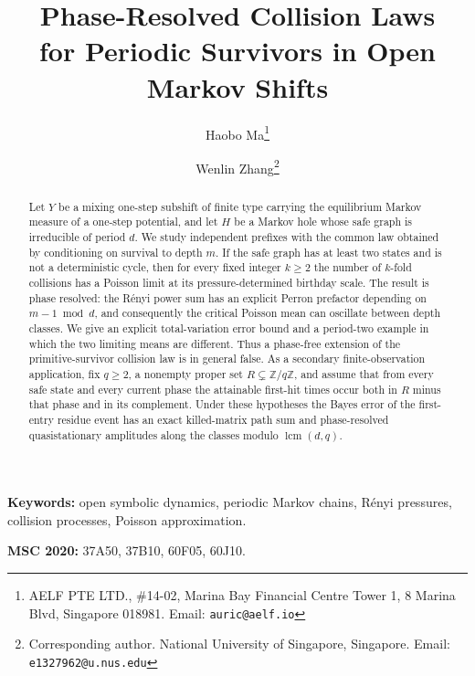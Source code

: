 \documentclass[10pt,a4paper]{article}
\title{Phase-Resolved Collision Laws\\
for Periodic Survivors in Open Markov Shifts}
\author{
  Haobo Ma\thanks{AELF PTE LTD., \#14-02, Marina Bay Financial Centre Tower 1, 8 Marina Blvd, Singapore 018981. Email: \texttt{auric@aelf.io}}
  \and
  Wenlin Zhang\thanks{Corresponding author. National University of Singapore, Singapore. Email: \texttt{e1327962@u.nus.edu}}
}
\date{}
\theoremstyle{plain}
\theoremstyle{definition}
\theoremstyle{remark}
\begin{document}
\maketitle

\begin{abstract}
Let \(Y\) be a mixing one-step subshift of finite type carrying the
equilibrium Markov measure of a one-step potential, and let \(H\) be a
Markov hole whose safe graph is irreducible of period \(d\).  We study
independent prefixes with the common law obtained by conditioning on
survival to depth \(m\).  If the safe graph has at least two states and
is not a deterministic cycle, then for every fixed integer \(k\geq2\)
the number of \(k\)-fold
collisions has a Poisson limit at its pressure-determined birthday
scale.  The result is phase resolved: the R\'enyi power sum has an
explicit Perron prefactor depending on \(m-1\bmod d\), and consequently
the critical Poisson mean can oscillate between depth classes.  We give
an explicit total-variation error bound and a period-two example in
which the two limiting means are different.  Thus a phase-free
extension of the primitive-survivor collision law is in general false.
As a secondary finite-observation application, fix \(q\geq2\), a
nonempty proper set \(R\subsetneq\mathbb Z/q\mathbb Z\), and assume that
from every safe state and every current phase the attainable first-hit
times occur both in \(R\) minus that phase and in its complement.  Under
these hypotheses the Bayes error of the first-entry residue event has an
exact killed-matrix path sum and phase-resolved quasistationary
amplitudes along the classes modulo \(\operatorname{lcm}(d,q)\).
\end{abstract}

{\small
\noindent\textbf{Keywords:}
open symbolic dynamics, periodic Markov chains, R\'enyi pressures,
collision processes, Poisson approximation.

\medskip
\noindent\textbf{MSC 2020:}
37A50, 37B10, 60F05, 60J10.
}

\bigskip









\end{document}
